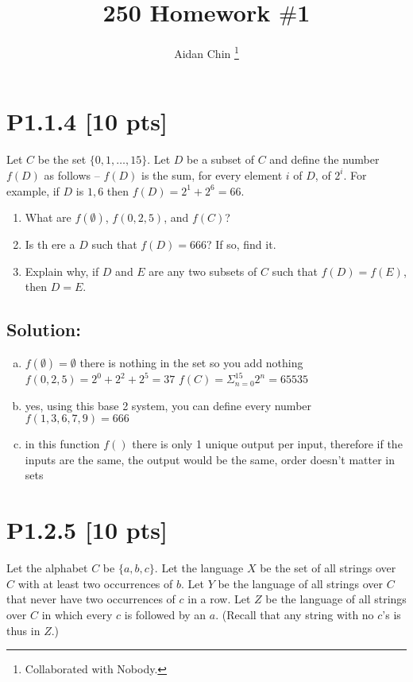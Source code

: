 \documentclass[12pt]{article}
\title{250 Homework $\#$1}
\author{Aidan Chin \footnote{Collaborated with Nobody.}}
\begin{document}
\maketitle

\section*{\textbf{P1.1.4} [10 pts]}
Let $C$ be the set $\{0, 1, \ldots, 15\}$. Let $D$ be a subset of $C$ and define the number $f(D)$ as follows – $f(D)$ is the sum, for every element $i$ of $D$, of $2^i$. For example, if $D$ is ${1, 6}$ then $f(D)= 2^1 + 2^6 = 66$.


\begin{enumerate}[label=(\alph*)]
    \item What are $f(\emptyset)$, $f({0, 2, 5})$, and $f(C)$? 
    
    \item Is th ere a $D$ such that $f(D) = 666$? If so, find it. 
    
    \item  Explain why, if $D$ and $E$ are any two subsets of $C$ such that $f(D)= f(E)$, then $D = E$.
\end{enumerate}


\subsection*{\textbf{Solution:}}
\begin{enumerate}[(a)]
    \item $f(\emptyset) = \emptyset$ there is nothing in the set so you add nothing $f(0,2,5) = 2^0 + 2^2 + 2^5 = 37$ $f(C) = \Sigma_{n  = 0}^{15} 2^n = 65535 $

    \item yes, using this base 2 system, you can define every number  $f(1,3,6,7,9) = 666$

    \item in this function $f()$ there is only 1 unique output per input, therefore if the inputs are the same, the output would be the same, order doesn't matter in sets

\end{enumerate}


\newpage
\section*{\textbf{P1.2.5} [10 pts]}
Let the alphabet $C$ be $\{a, b, c\}$. Let the language $X$ be the set of all strings over $C$ with at least two occurrences of $b$. Let $Y$ be the language of all strings over $C$ that never have two occurrences of $c$ in a row. Let $Z$ be the language of all strings over $C$ in which every $c$ is followed by an $a$. (Recall that any string with no $c$’s is thus in $Z$.)
\end{document}

